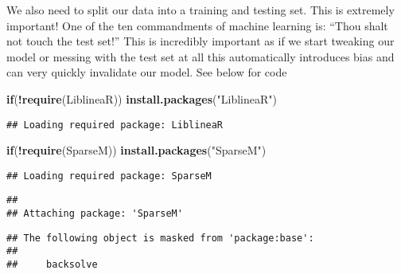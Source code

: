 \documentclass[
]{article}
\newenvironment{Shaded}{\begin{snugshade}}{\end{snugshade}}
\newcommand{\ControlFlowTok}[1]{\textcolor[rgb]{0.13,0.29,0.53}{\textbf{#1}}}
\newcommand{\KeywordTok}[1]{\textcolor[rgb]{0.13,0.29,0.53}{\textbf{#1}}}
\newcommand{\NormalTok}[1]{#1}
\newcommand{\OperatorTok}[1]{\textcolor[rgb]{0.81,0.36,0.00}{\textbf{#1}}}
\newcommand{\StringTok}[1]{\textcolor[rgb]{0.31,0.60,0.02}{#1}}
\begin{document}
We also need to split our data into a training and testing set. This is
extremely important! One of the ten commandments of machine learning is:
``Thou shalt not touch the test set!'' This is incredibly important as
if we start tweaking our model or messing with the test set at all this
automatically introduces bias and can very quickly invalidate our model.
See below for code

\begin{Shaded}
\begin{Highlighting}[]
\ControlFlowTok{if}\NormalTok{(}\OperatorTok{!}\KeywordTok{require}\NormalTok{(LiblineaR)) }\KeywordTok{install.packages}\NormalTok{(}\StringTok{"LiblineaR"}\NormalTok{)}
\end{Highlighting}
\end{Shaded}

\begin{verbatim}
## Loading required package: LiblineaR
\end{verbatim}

\begin{Shaded}
\begin{Highlighting}[]
\ControlFlowTok{if}\NormalTok{(}\OperatorTok{!}\KeywordTok{require}\NormalTok{(SparseM)) }\KeywordTok{install.packages}\NormalTok{(}\StringTok{"SparseM"}\NormalTok{)}
\end{Highlighting}
\end{Shaded}

\begin{verbatim}
## Loading required package: SparseM
\end{verbatim}

\begin{verbatim}
## 
## Attaching package: 'SparseM'
\end{verbatim}

\begin{verbatim}
## The following object is masked from 'package:base':
## 
##     backsolve
\end{verbatim}
\end{document}
